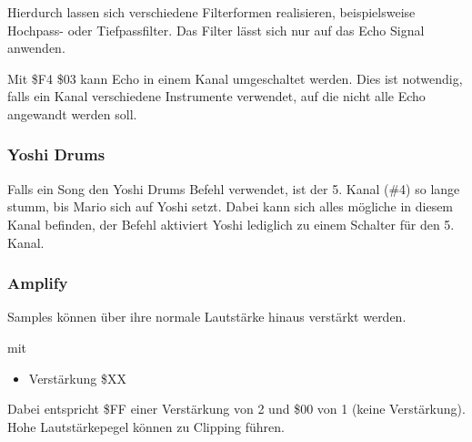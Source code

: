 \medskip



\medskip

Hierdurch lassen sich verschiedene Filterformen realisieren, beispielsweise Hochpass- oder Tiefpassfilter.
Das Filter lässt sich nur auf das Echo Signal anwenden.

\bigskip

Mit \$F4 \$03 kann Echo in einem Kanal umgeschaltet werden. Dies ist notwendig, falls ein Kanal verschiedene Instrumente verwendet, auf die nicht alle Echo angewandt werden soll.

\subsubsection{Yoshi Drums}

Falls ein Song den Yoshi Drums Befehl verwendet, ist der 5. Kanal (\#4) so lange stumm, bis Mario sich auf Yoshi setzt. Dabei kann sich alles mögliche in diesem Kanal befinden, der Befehl aktiviert Yoshi lediglich zu einem Schalter für den 5. Kanal.

\medskip



\medskip

\subsubsection{Amplify}

Samples können über ihre normale Lautstärke hinaus verstärkt werden.

\medskip



\medskip

mit

\begin{itemize}
	\item Verstärkung \$XX
\end{itemize}

Dabei entspricht \$FF einer Verstärkung von 2 und \$00 von 1 (keine Verstärkung). Hohe Lautstärkepegel können zu Clipping führen.

